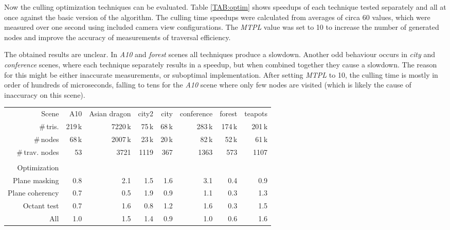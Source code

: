 \documentclass[report,11pt]{elsarticle}
\begin{document}
Now the culling optimization techniques can be evaluated. Table \ref{TAB:optim} shows speedups of each technique tested separately and all at once against the basic version of the algorithm. The culling time speedups were calculated from averages of circa 60 values, which were measured over one second using included camera view configurations. The \emph{MTPL} value was set to 10 to increase the number of generated nodes and improve the accuracy of measurements of traversal efficiency.

The obtained results are unclear. In \emph{A10} and \emph{forest} scenes all techniques produce a slowdown. Another odd behaviour occurs in \emph{city} and \emph{conference} scenes, where each technique separately results in a speedup, but when combined together they cause a slowdown. The reason for this might be either inaccurate measurements, or suboptimal implementation. After setting \emph{MTPL} to 10, the culling time is mostly in order of hundreds of microseconds, falling to tens for the \emph{A10} scene where only few nodes are visited (which is likely the cause of inaccuracy on this scene).

\begin{table*}[t]
\begin{center}
\begin{tabular}{| r || r | r | r | r | r | r | r |}
	\hline
	Scene                                   & A10 & Asian dragon & city2 & city & conference & forest & teapots \\
	\#\,tris.                               & 219\,k & 7220\,k & 75\,k & 68\,k & 283\,k & 174\,k & 201\,k \\
	\#\,nodes                               & 68\,k & 2007\,k & 23\,k & 20\,k & 82\,k & 52\,k & 61\,k \\
	\#\,trav. nodes                         & 53  & 3721 & 1119 & 367 & 1363  & 573 & 1107 \\
	\diagbox[width=10em]{\\Optimization}{} &&&&&&& \\
\hline
\hline
	Plane masking                           & 0.8 & 2.1 & 1.5 & 1.6 & 3.1 & 0.4 & 0.9 \\
\hline
	Plane coherency                         & 0.7 & 0.5 & 1.9 & 0.9 & 1.1 & 0.3 & 1.3 \\
\hline
	Octant test                             & 0.7 & 1.6 & 0.8 & 1.2 & 1.6 & 0.3 & 1.5 \\
\hline
	All                                     & 1.0 & 1.5 & 1.4 & 0.9 & 1.0 & 0.6 & 1.6 \\
\hline
\end{tabular}
\end{center}
	\caption{Vief frustum culling speedups for individual and all optimization techniques (compared against no optimization) at selected views. \emph{MTPL} was set to 10.}
	\label{TAB:optim}
\end{table*}
\end{document}
